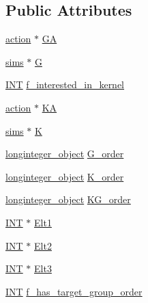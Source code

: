 \subsection*{Public Attributes}
\begin{DoxyCompactItemize}
\item 
\mbox{\hyperlink{classaction}{action}} $\ast$ \mbox{\hyperlink{classschreier__sims_a8474d2873bad522392cafaf40fd3ca90}{GA}}
\item 
\mbox{\hyperlink{classsims}{sims}} $\ast$ \mbox{\hyperlink{classschreier__sims_a3172d6aff76da760b43ed9c8c14c1be4}{G}}
\item 
\mbox{\hyperlink{galois_8h_a09fddde158a3a20bd2dcadb609de11dc}{I\+NT}} \mbox{\hyperlink{classschreier__sims_a1adef1bc9f47afb64b2c50dde54a1025}{f\+\_\+interested\+\_\+in\+\_\+kernel}}
\item 
\mbox{\hyperlink{classaction}{action}} $\ast$ \mbox{\hyperlink{classschreier__sims_a4de4f2f51ed18ce36dbcbaf1b8ab794f}{KA}}
\item 
\mbox{\hyperlink{classsims}{sims}} $\ast$ \mbox{\hyperlink{classschreier__sims_a77d51a03c5f55a13a043a0601df80e24}{K}}
\item 
\mbox{\hyperlink{classlonginteger__object}{longinteger\+\_\+object}} \mbox{\hyperlink{classschreier__sims_a085fa53aa227628e0f4010ac7fc11f90}{G\+\_\+order}}
\item 
\mbox{\hyperlink{classlonginteger__object}{longinteger\+\_\+object}} \mbox{\hyperlink{classschreier__sims_add579e8f04908e8f2940161ec5bdda38}{K\+\_\+order}}
\item 
\mbox{\hyperlink{classlonginteger__object}{longinteger\+\_\+object}} \mbox{\hyperlink{classschreier__sims_ae27bf6d98b01f4990ce54ec124ea06d2}{K\+G\+\_\+order}}
\item 
\mbox{\hyperlink{galois_8h_a09fddde158a3a20bd2dcadb609de11dc}{I\+NT}} $\ast$ \mbox{\hyperlink{classschreier__sims_a96702aa4fe1cc0d2e225de54c451e2d8}{Elt1}}
\item 
\mbox{\hyperlink{galois_8h_a09fddde158a3a20bd2dcadb609de11dc}{I\+NT}} $\ast$ \mbox{\hyperlink{classschreier__sims_a99141364981c07557ee0b24fa5dd0a95}{Elt2}}
\item 
\mbox{\hyperlink{galois_8h_a09fddde158a3a20bd2dcadb609de11dc}{I\+NT}} $\ast$ \mbox{\hyperlink{classschreier__sims_a8a1be7e0d71f7b27fbcef187a3a46571}{Elt3}}
\item 
\mbox{\hyperlink{galois_8h_a09fddde158a3a20bd2dcadb609de11dc}{I\+NT}} \mbox{\hyperlink{classschreier__sims_a8b48f8ee2d6b30fd019e86db3b4b2210}{f\+\_\+has\+\_\+target\+\_\+group\+\_\+order}}

\end{DoxyCompactItemize}
